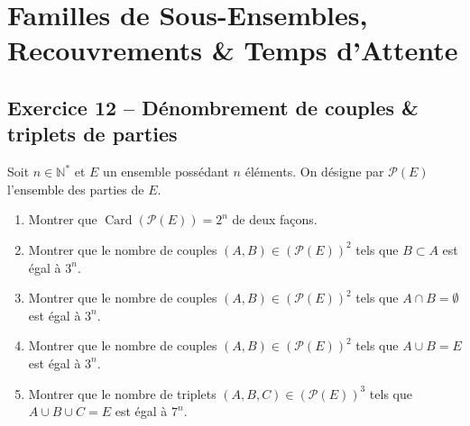 \documentclass[11pt,a4paper]{article}
\newcommand{\N}{\mathbb{N}}
\begin{document}
\vspace{0.4cm}

\section{Familles de Sous-Ensembles, Recouvrements \& Temps d'Attente}

\subsection*{Exercice 12 -- Dénombrement de couples \& triplets de parties}

Soit $n \in \N^*$ et $E$ un ensemble possédant $n$ éléments. On désigne par $\mathscr{P}(E)$ l'ensemble des parties de $E$.
\begin{enumerate}[label=\arabic*.]
    \item Montrer que $\operatorname{Card}(\mathscr{P}(E)) = 2^n$ de deux façons.
    \item Montrer que le nombre de couples $(A, B) \in (\mathscr{P}(E))^2$ tels que $B \subset A$ est égal à $3^n$.
    \item Montrer que le nombre de couples $(A, B) \in (\mathscr{P}(E))^2$ tels que $A \cap B = \emptyset$ est égal à $3^n$.
    \item Montrer que le nombre de couples $(A, B) \in (\mathscr{P}(E))^2$ tels que $A \cup B = E$ est égal à $3^n$.
    \item Montrer que le nombre de triplets $(A, B, C) \in (\mathscr{P}(E))^3$ tels que $A \cup B \cup C = E$ est égal à $7^n$.
\end{enumerate}
\end{document}
